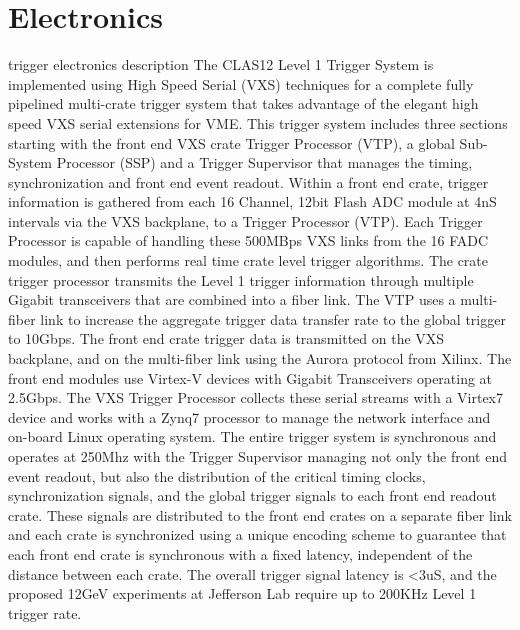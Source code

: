 \section{Electronics}

trigger electronics description
The CLAS12 Level 1 Trigger System is implemented using High Speed Serial (VXS) techniques for a complete fully pipelined multi-crate trigger system that takes advantage of the elegant high speed VXS serial extensions for VME.  This trigger system includes three sections starting with the front end VXS crate Trigger Processor (VTP), a global Sub-System Processor (SSP) and a Trigger Supervisor that manages the timing, synchronization and front end event readout.  
     Within a front end crate, trigger information is gathered from each 16 Channel, 12bit Flash ADC module at 4nS intervals via the VXS backplane, to a Trigger Processor (VTP).  Each Trigger Processor is capable of handling these 500MBps VXS links from the 16 FADC modules, and then performs real time crate level trigger algorithms.  The crate trigger processor transmits the Level 1 trigger information through multiple Gigabit transceivers that are combined into a fiber link.  The VTP uses a multi-fiber link to increase the aggregate trigger data transfer rate to the global trigger to 10Gbps.
     The front end crate trigger data is transmitted on the VXS backplane, and on the multi-fiber link using the Aurora protocol from Xilinx.  The front end modules use Virtex-V devices with Gigabit Transceivers operating at 2.5Gbps. The VXS Trigger Processor collects these serial streams with a Virtex7 device and works with a Zynq7 processor to manage the network interface and on-board Linux operating system.
     The entire trigger system is synchronous and operates at 250Mhz with the Trigger Supervisor managing not only the front end event readout, but also the distribution of the critical timing clocks, synchronization signals, and the global trigger signals to each front end readout crate.  These signals are distributed to the front end crates on a separate fiber link and each crate is synchronized using a unique encoding scheme to guarantee that each front end crate is synchronous with a fixed latency, independent of the distance between each crate.  The overall trigger signal latency is <3uS, and the proposed 12GeV experiments at Jefferson Lab require up to 200KHz Level 1 trigger rate.

